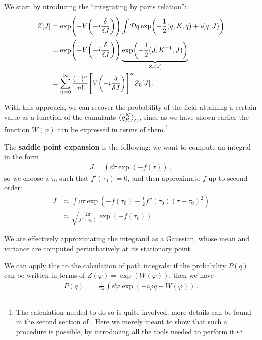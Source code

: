 \documentclass[main.tex]{subfiles}
\begin{document}

We start by ntroducing the ``integrating by parts relation'':
%
\begin{align}
Z[J] &= \exp(- V \qty(-i \fdv{}{J})) 
\int \mathcal{D}q \exp(- \frac{1}{2} (q, K, q) + i (q, J) )  \\
&= \exp(- V \qty(-i \fdv{}{J}))
\underbrace{\exp(- \frac{1}{2} (J, K^{-1}, J))}_{Z_0 [J]}  \\
&= \sum _{n=0}^{\infty } \frac{(-)^{n}}{n!} \qty[V \qty(-i \fdv{}{J})]^{n} Z_0 [J]
\,.
\end{align}

With this approach, we can recover the probability of the field attaining a certain value as a function of the cumulants \(\expval{q_R^{N}}_C\), since as we have shown earlier the function \(W(\varphi )\) can be expressed in terms of them.\footnote{The calculation needed to do so is quite involved, more details can be found in the second section of \textcite[]{matarresePathintegralApproachLargescale1986}. Here we merely meant to show that such a procedure is possible, by introducing all the tools needed to perform it.} 

The \textbf{saddle point expansion} is the following: we want to compute an integral in the form 
%
\begin{align}
J = \int \dd{\tau } \exp(
    - f(\tau )
)
\,,
\end{align}
%
so we choose a \(\tau_0 \) such that \(f' (\tau_0 ) = 0\), and then approximate \(f\) up to second order: 
%
\begin{align}
J &\approx \int \dd{\tau } \exp(
    - f(\tau_0 ) - \frac{1}{2} f''(\tau_0 ) (\tau - \tau_0  )^2
)  \\
&\approx \sqrt{\frac{2 \pi }{f''(\tau_0 )}} \exp(- f(\tau_0 ))
\,.
\end{align}

We are effectively approximating the integrand as a Gaussian, whose mean and variance are computed perturbatively at its stationary point. 

We can apply this to the calculation of path integrals: if the probability \(P(q)\) can be written in terms of \(Z(\varphi ) = \exp(W(\varphi ))\), then we have 
%
\begin{align}
P(q) &= \frac{1}{2 \pi } \int \dd{\varphi } \exp(-i \varphi q + W(\varphi ))
\,.
\end{align}
\end{document}
